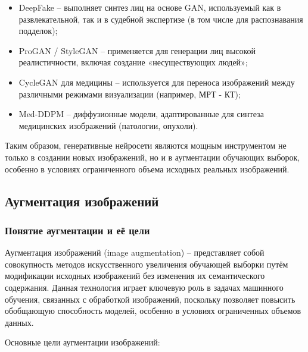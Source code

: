 \begin{itemize}
	\item DeepFake – выполняет синтез лиц на основе GAN, используемый как в развлекательной, так и в судебной экспертизе (в том числе для распознавания подделок);
	\item ProGAN / StyleGAN – применяется для генерации лиц высокой реалистичности, включая создание «несуществующих людей»;
	\item CycleGAN для медицины – используется для переноса изображений между различными режимами визуализации (например, МРТ - КТ);
	\item Med-DDPM – диффузионные модели, адаптированные для синтеза медицинских изображений (патологии, опухоли).
\end{itemize}

Таким образом, генеративные нейросети являются мощным инструментом не только в создании новых изображений, но и в аугментации обучающих выборок, особенно в условиях ограниченного объема исходных реальных изображений.

\subsection{Аугментация изображений}
\subsubsection{Понятие аугментации и её цели}

Аугментация изображений (image augmentation) – представляет собой совокупность методов искусственного увеличения обучающей выборки путём модификации исходных изображений без изменения их семантического содержания. Данная технология играет ключевую роль в задачах машинного обучения, связанных с обработкой изображений, поскольку позволяет повысить обобщающую способность моделей, особенно в условиях ограниченных объемов данных.

Основные цели аугментации изображений:

